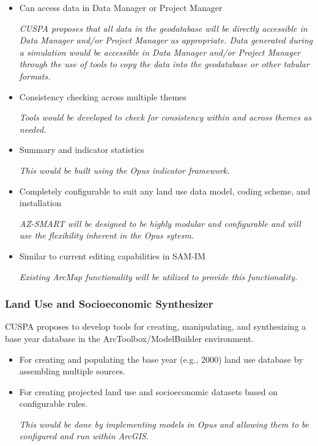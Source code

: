 \begin{itemize}
\item Can access data in Data Manager or Project Manager

\emph{CUSPA proposes that all data in the geodatabase will be directly accessible in Data Manager and/or Project Manager as appropriate.  Data generated during a simulation would be accessible in Data Manager and/or Project Manager through the use of tools to copy the data into the geodatabase or other tabular formats.}

\item Consistency checking across multiple themes

\emph{Tools would be developed to check for consistency within and across themes as needed.}

\item Summary and indicator statistics

\emph{This would be built using the Opus indicator framework.}

\item Completely configurable to suit any land use data model, coding scheme, and installation

\emph{AZ-SMART will be designed to be highly modular and configurable and will use the flexibility inherent in the Opus sytesm.}

\item Similar to current editing capabilities in SAM-IM

\emph{Existing ArcMap functionality will be utilized to provide this functionality.}

\end{itemize}

\subsubsection{Land Use and Socioeconomic Synthesizer}

CUSPA proposes to develop tools for creating, manipulating, and synthesizing a base year database in the ArcToolbox/ModelBuilder environment.

\begin{itemize}

\item For creating and populating the base year (e.g., 2000) land use database by assembling multiple sources.

\item For creating projected land use and socioeconomic datasets based on configurable rules.

\emph{This would be done by implementing models in Opus and allowing them to be configured and run within ArcGIS. }

\end{itemize}

